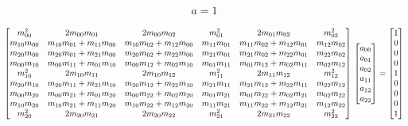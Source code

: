 \documentclass[conference]{IEEEtran}
\begin{document}
\begin{align*}
a =1
\end{align*}
\begin{tiny}
  

\begin{equation}
\begin{bmatrix}
m_{00}^2 & 2m_{00}m_{01} & 2m_{00}m_{02} & m_{01}^2 & 2m_{01}m_{02} & m_{02}^2 \\
 m_{10}m_{00} & m_{10}m_{01}+ m_{11}m_{00}  & m_{10}m_{02} + m_{12}m_{00}& m_{11}m_{01} & m_{11}m_{02}  + m_{12}m_{01} & m_{12}m_{02}\\
 m_{20}m_{00} &  m_{20}m_{01}+ m_{21}m_{00 }&   m_{20}m_{02} + m_{22}m_{00} &  m_{21}m_{01} & m_{21}m_{02} + m_{22}m_{01} & m_{22}m_{02}\\
m_{00}m_{10} & m_{00}m_{11} + m_{01}m_{10} & m_{00}m_{12} + m_{02}m_{10} & m_{01}m_{11} & m_{01}m_{12} + m_{02}m_{11} & m_{02}m_{12}\\
 m_{10}^2 & 2m_{10}m_{11} & 2m_{10}m_{12} &  m_{11}^2 & 2m_{11}m_{12} & m_{12}^2\\
 m_{20}m_{10} & m_{20}m_{11}+ m_{21}m_{10} &  m_{20}m_{12}+ m_{22}m_{10} &  m_{21}m_{11}& m_{21}m_{12} + m_{22}m_{11} & m_{22}m_{12}\\
 m_{00}m_{20} & m_{00}m_{21} + m_{01}m_{20} & m_{00}m_{22} + m_{02}m_{20} & m_{01}m_{21} & m_{01}m_{22} + m_{02}m_{21} & m_{02}m_{22}\\
m_{10}m_{20} & m_{10}m_{21} + m_{11}m_{20} & m_{10}m_{22} + m_{12}m_{20} & m_{11}m_{21} & m_{11}m_{22} + m_{12}m_{21} & m_{12}m_{22}\\
 m_{20}^2 & 2m_{20}m_{21}& 2m_{20}m_{22} & m_{21}^2 & 2m_{21}m_{22} & m_{22}^2
 
\end{bmatrix} \\
\begin{bmatrix}
a_{00}\\
a_{01}\\
a_{02}\\
a_{11}\\
a_{12}\\
a_{22}
\end{bmatrix} = 
\begin{bmatrix}
1\\
0\\
0\\
0\\
1\\
0\\
0\\
0\\
1
\end{bmatrix}
\label{eq:least_sq_aat}
\end{equation}

\end{tiny}
\end{document}
